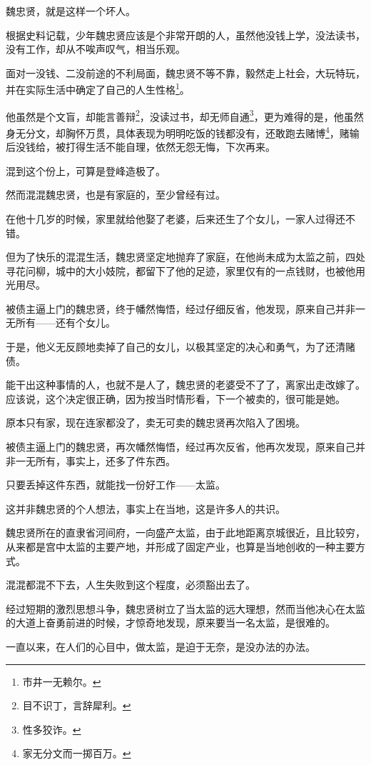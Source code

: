 \begin{multicols}{\theparacolNo}
魏忠贤，就是这样一个坏人。

根据史料记载，少年魏忠贤应该是个非常开朗的人，虽然他没钱上学，没法读书，没有工作，却从不唉声叹气，相当乐观。

面对一没钱、二没前途的不利局面，魏忠贤不等不靠，毅然走上社会，大玩特玩，并在实际生活中确定了自己的人生性格\footnote{市井一无赖尔。}。

他虽然是个文盲，却能言善辩\footnote{目不识丁，言辞犀利。}，没读过书，却无师自通\footnote{性多狡诈。}，更为难得的是，他虽然身无分文，却胸怀万贯，具体表现为明明吃饭的钱都没有，还敢跑去赌博\footnote{家无分文而一掷百万。}，赌输后没钱给，被打得生活不能自理，依然无怨无悔，下次再来。

混到这个份上，可算是登峰造极了。

然而混混魏忠贤，也是有家庭的，至少曾经有过。

在他十几岁的时候，家里就给他娶了老婆，后来还生了个女儿，一家人过得还不错。

但为了快乐的混混生活，魏忠贤坚定地抛弃了家庭，在他尚未成为太监之前，四处寻花问柳，城中的大小妓院，都留下了他的足迹，家里仅有的一点钱财，也被他用光用尽。

被债主逼上门的魏忠贤，终于幡然悔悟，经过仔细反省，他发现，原来自己并非一无所有——还有个女儿。

于是，他义无反顾地卖掉了自己的女儿，以极其坚定的决心和勇气，为了还清赌债。

能干出这种事情的人，也就不是人了，魏忠贤的老婆受不了了，离家出走改嫁了。应该说，这个决定很正确，因为按当时情形看，下一个被卖的，很可能是她。

原本只有家，现在连家都没了，卖无可卖的魏忠贤再次陷入了困境。

被债主逼上门的魏忠贤，再次幡然悔悟，经过再次反省，他再次发现，原来自己并非一无所有，事实上，还多了件东西。

只要丢掉这件东西，就能找一份好工作——太监。

这并非魏忠贤的个人想法，事实上在当地，这是许多人的共识。

魏忠贤所在的直隶省河间府，一向盛产太监，由于此地距离京城很近，且比较穷，从来都是宫中太监的主要产地，并形成了固定产业，也算是当地创收的一种主要方式。

混混都混不下去，人生失败到这个程度，必须豁出去了。

经过短期的激烈思想斗争，魏忠贤树立了当太监的远大理想，然而当他决心在太监的大道上奋勇前进的时候，才惊奇地发现，原来要当一名太监，是很难的。

一直以来，在人们的心目中，做太监，是迫于无奈，是没办法的办法。


\end{multicols}
